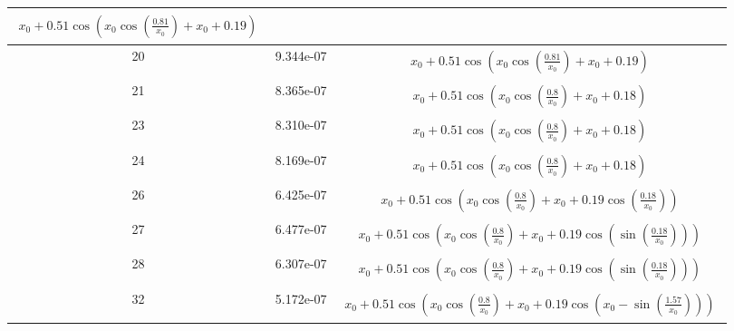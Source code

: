 \begin{center}
\begin{tabular}{|c|c|c|}
$\begin{aligned}x_{0} + 0.51 \cos{\left(x_{0} \cos{\left(\frac{0.81}{x_{0}} \right)} + x_{0} + 0.19 \right)}\end{aligned}$\\ \hline20 & 9.344e-07 & $\begin{aligned}x_{0} + 0.51 \cos{\left(x_{0} \cos{\left(\frac{0.81}{x_{0}} \right)} + x_{0} + 0.19 \right)}\end{aligned}$\\ \hline21 & 8.365e-07 & $\begin{aligned}x_{0} + 0.51 \cos{\left(x_{0} \cos{\left(\frac{0.8}{x_{0}} \right)} + x_{0} + 0.18 \right)}\end{aligned}$\\ \hline23 & 8.310e-07 & $\begin{aligned}x_{0} + 0.51 \cos{\left(x_{0} \cos{\left(\frac{0.8}{x_{0}} \right)} + x_{0} + 0.18 \right)}\end{aligned}$\\ \hline24 & 8.169e-07 & $\begin{aligned}x_{0} + 0.51 \cos{\left(x_{0} \cos{\left(\frac{0.8}{x_{0}} \right)} + x_{0} + 0.18 \right)}\end{aligned}$\\ \hline26 & 6.425e-07 & $\begin{aligned}x_{0} + 0.51 \cos{\left(x_{0} \cos{\left(\frac{0.8}{x_{0}} \right)} + x_{0} + 0.19 \cos{\left(\frac{0.18}{x_{0}} \right)} \right)}\end{aligned}$\\ \hline27 & 6.477e-07 & $\begin{aligned}x_{0} + 0.51 \cos{\left(x_{0} \cos{\left(\frac{0.8}{x_{0}} \right)} + x_{0} + 0.19 \cos{\left(\sin{\left(\frac{0.18}{x_{0}} \right)} \right)} \right)}\end{aligned}$\\ \hline28 & 6.307e-07 & $\begin{aligned}x_{0} + 0.51 \cos{\left(x_{0} \cos{\left(\frac{0.8}{x_{0}} \right)} + x_{0} + 0.19 \cos{\left(\sin{\left(\frac{0.18}{x_{0}} \right)} \right)} \right)}\end{aligned}$\\ \hline32 & 5.172e-07 & $\begin{aligned}x_{0} + 0.51 \cos{\left(x_{0} \cos{\left(\frac{0.8}{x_{0}} \right)} + x_{0} + 0.19 \cos{\left(x_{0} - \sin{\left(\frac{1.57}{x_{0}} \right)} \right)} \right)}\end{aligned}$\\ \hline\end{tabular}
        \end{center}
        